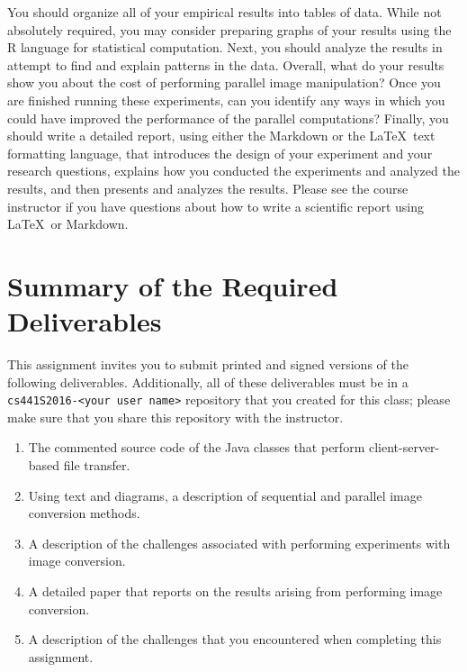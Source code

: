 You should organize all of your empirical results into tables of data. While not absolutely required, you may consider
preparing graphs of your results using the R language for statistical computation. Next, you should analyze the results
in attempt to find and explain patterns in the data. Overall, what do your results show you about the cost of performing
parallel image manipulation? Once you are finished running these experiments, can you identify any ways in which you
could have improved the performance of the parallel computations? Finally, you should write a detailed report, using
either the Markdown or the \LaTeX~text formatting language, that introduces the design of your experiment and your
research questions, explains how you conducted the experiments and analyzed the results, and then presents and analyzes
the results.  Please see the course instructor if you have questions about how to write a scientific report using
\LaTeX~or Markdown.

\section*{Summary of the Required Deliverables}

This assignment invites you to submit printed and signed versions of the following deliverables. Additionally,
all of these deliverables must be in a {\tt cs441S2016-<your user name>} repository that you created for this class;
please make sure that you share this repository with the instructor.

\begin{enumerate}

    \item The commented source code of the Java classes that perform client-server-based file transfer.

    \item Using text and diagrams, a description of sequential and parallel image conversion methods.

    \item A description of the challenges associated with performing experiments with image conversion.

    \item A detailed paper that reports on the results arising from performing image conversion.

    \item A description of the challenges that you encountered when completing this assignment.

\end{enumerate}

